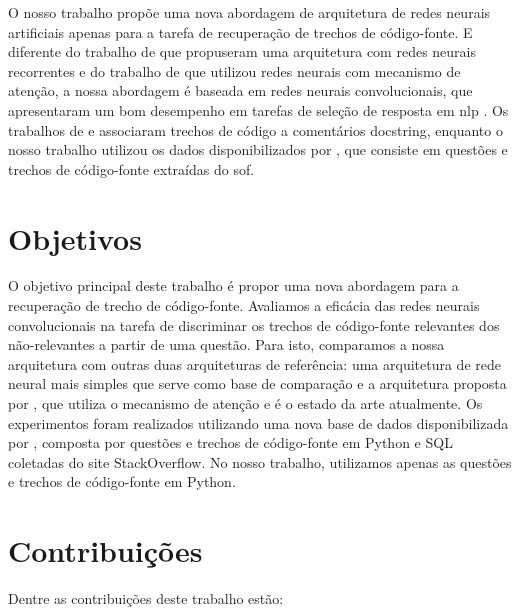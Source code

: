 O nosso trabalho propõe uma nova abordagem de arquitetura de redes neurais artificiais apenas para a tarefa de recuperação de trechos de código-fonte. E diferente do trabalho de \cite{Gu-deep-code-search:2018} que propuseram uma arquitetura com redes neurais recorrentes e do trabalho de \cite{cambronero-deep-learning-code-search:2019} que utilizou redes neurais com mecanismo de atenção, a nossa abordagem é baseada em redes neurais convolucionais, que apresentaram um bom desempenho em tarefas de seleção de resposta em \acrshort{nlp} \citep{feng-2015, tan-lstm-qa, wen-joint-modeling-question-answer-2019}. Os trabalhos de \cite{Gu-deep-code-search:2018} e \cite{cambronero-deep-learning-code-search:2019} associaram trechos de código a comentários \gls{docstring}, enquanto o nosso trabalho utilizou os dados disponibilizados por \cite{yao-2018}, que consiste em questões e trechos de código-fonte extraídas do \Gls{sof}.

\section{Objetivos}
\label{sec:objetivo}

O objetivo principal deste trabalho é propor uma nova abordagem  para a recuperação de trecho de código-fonte. Avaliamos a eficácia das redes neurais convolucionais na tarefa de discriminar os trechos de código-fonte relevantes dos não-relevantes a partir de uma questão. Para isto, comparamos a nossa arquitetura com outras duas arquiteturas de referência: uma arquitetura de rede neural mais simples que serve como base de comparação e a arquitetura proposta por \cite{cambronero-deep-learning-code-search:2019}, que utiliza o mecanismo de atenção e é o estado da arte atualmente. Os experimentos foram realizados utilizando uma nova base de dados disponibilizada por \cite{yao-2018}, composta por questões e trechos de código-fonte em Python e SQL coletadas do site StackOverflow. No nosso trabalho, utilizamos apenas as questões e trechos de código-fonte em Python.

\section{Contribuições}
\label{sec:contribucoes}

Dentre as contribuições deste trabalho estão:

